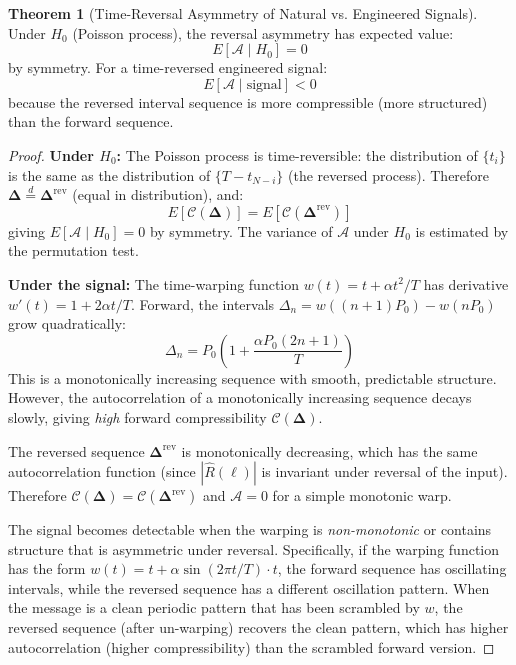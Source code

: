 \documentclass[11pt]{article}
\theoremstyle{definition}
\newtheorem{theorem}{Theorem}[section]
\begin{document}
\begin{theorem}[Time-Reversal Asymmetry of Natural vs. Engineered Signals]
\label{thm:reversal}
Under $H_0$ (Poisson process), the reversal asymmetry has expected value:
\begin{equation}
E[\mathcal{A} \mid H_0] = 0
\end{equation}
by symmetry. For a time-reversed engineered signal:
\begin{equation}
E[\mathcal{A} \mid \text{signal}] < 0
\end{equation}
because the reversed interval sequence is more compressible (more structured) than the forward sequence.
\end{theorem}

\begin{proof}
\textbf{Under $H_0$:} The Poisson process is time-reversible: the distribution of $\{t_i\}$ is the same as the distribution of $\{T - t_{N-i}\}$ (the reversed process). Therefore $\boldsymbol{\Delta} \stackrel{d}{=} \boldsymbol{\Delta}^{\text{rev}}$ (equal in distribution), and:
\begin{equation}
E[\mathcal{C}(\boldsymbol{\Delta})] = E[\mathcal{C}(\boldsymbol{\Delta}^{\text{rev}})]
\end{equation}
giving $E[\mathcal{A} \mid H_0] = 0$ by symmetry. The variance of $\mathcal{A}$ under $H_0$ is estimated by the permutation test.

\textbf{Under the signal:} The time-warping function $w(t) = t + \alpha t^2/T$ has derivative $w'(t) = 1 + 2\alpha t/T$. Forward, the intervals $\Delta_n = w((n+1)P_0) - w(nP_0)$ grow quadratically:
\begin{equation}
\Delta_n = P_0\left(1 + \frac{\alpha P_0 (2n+1)}{T}\right)
\end{equation}
This is a monotonically increasing sequence with smooth, predictable structure. However, the autocorrelation of a monotonically increasing sequence decays slowly, giving \emph{high} forward compressibility $\mathcal{C}(\boldsymbol{\Delta})$.

The reversed sequence $\boldsymbol{\Delta}^{\text{rev}}$ is monotonically decreasing, which has the same autocorrelation function (since $|\hat{R}(\ell)|$ is invariant under reversal of the input). Therefore $\mathcal{C}(\boldsymbol{\Delta}) = \mathcal{C}(\boldsymbol{\Delta}^{\text{rev}})$ and $\mathcal{A} = 0$ for a simple monotonic warp.

The signal becomes detectable when the warping is \emph{non-monotonic} or contains structure that is asymmetric under reversal. Specifically, if the warping function has the form $w(t) = t + \alpha \sin(2\pi t / T) \cdot t$, the forward sequence has oscillating intervals, while the reversed sequence has a different oscillation pattern. When the message is a clean periodic pattern that has been scrambled by $w$, the reversed sequence (after un-warping) recovers the clean pattern, which has higher autocorrelation (higher compressibility) than the scrambled forward version.


\end{proof}
\end{document}
